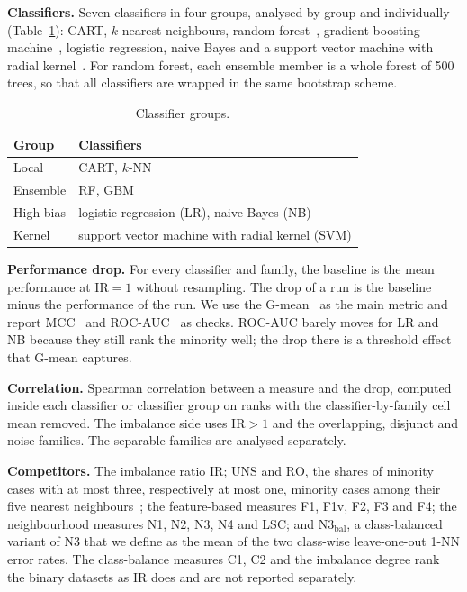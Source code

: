 \documentclass[preprint,12pt]{elsarticle}
\newcommand{\IR}{\mathrm{IR}}
\newcommand{\UNS}{\mathrm{UNS}}
\newcommand{\RO}{\mathrm{RO}}
\newcommand{\Nbal}{\mathrm{N3}_{\mathrm{bal}}}
\begin{document}
\textbf{Classifiers.} Seven classifiers in four groups, analysed by group and individually (Table~\ref{tab:groups}): CART, $k$-nearest neighbours, random forest~\cite{Breiman2001}, gradient boosting machine~\cite{Friedman2001}, logistic regression, naive Bayes and a support vector machine with radial kernel~\cite{Cortes1995}. For random forest, each ensemble member is a whole forest of 500 trees, so that all classifiers are wrapped in the same bootstrap scheme.

\begin{table}[H]
\centering
\caption{Classifier groups.}\label{tab:groups}
\begin{tabular}{ll}
\toprule
Group & Classifiers \\
\midrule
Local & CART, $k$-NN \\
Ensemble & RF, GBM \\
High-bias & logistic regression (LR), naive Bayes (NB) \\
Kernel & support vector machine with radial kernel (SVM) \\
\bottomrule
\end{tabular}
\end{table}

\textbf{Performance drop.} For every classifier and family, the baseline is the mean performance at $\IR=1$ without resampling. The drop of a run is the baseline minus the performance of the run. We use the G-mean~\cite{Kubat1997} as the main metric and report MCC~\cite{Chicco2020} and ROC-AUC~\cite{Fawcett2006} as checks. ROC-AUC barely moves for LR and NB because they still rank the minority well; the drop there is a threshold effect that G-mean captures.

\textbf{Correlation.} Spearman correlation between a measure and the drop, computed inside each classifier or classifier group on ranks with the classifier-by-family cell mean removed. The imbalance side uses $\IR>1$ and the overlapping, disjunct and noise families. The separable families are analysed separately.

\textbf{Competitors.} The imbalance ratio $\IR$; $\UNS$ and $\RO$, the shares of minority cases with at most three, respectively at most one, minority cases among their five nearest neighbours~\cite{Napierala2016}; the feature-based measures F1, F1v, F2, F3 and F4; the neighbourhood measures N1, N2, N3, N4 and LSC; and $\Nbal$, a class-balanced variant of N3 that we define as the mean of the two class-wise leave-one-out 1-NN error rates. The class-balance measures C1, C2 and the imbalance degree rank the binary datasets as $\IR$ does and are not reported separately.
\end{document}
